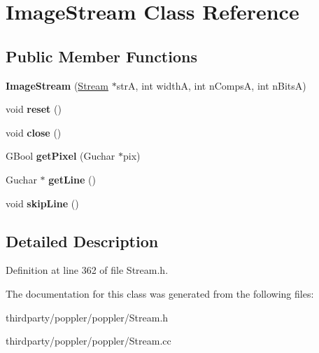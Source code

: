 \hypertarget{class_image_stream}{}\section{Image\+Stream Class Reference}
\label{class_image_stream}
\subsection*{Public Member Functions}
\begin{DoxyCompactItemize}
\item 
\mbox{\label{class_image_stream_a0e4cc8cb8ccb9956cd8f08f92755110c}} 
{\bfseries Image\+Stream} (\hyperlink{class_stream}{Stream} $\ast$strA, int widthA, int n\+CompsA, int n\+BitsA)
\item 
\mbox{\label{class_image_stream_a97cce560b257f33402e6276fec25e076}} 
void {\bfseries reset} ()
\item 
\mbox{\label{class_image_stream_a6211827fb1c99a5928c3d8376899ea96}} 
void {\bfseries close} ()
\item 
\mbox{\label{class_image_stream_a89d4082b1a680f8dd32314a936c3707f}} 
G\+Bool {\bfseries get\+Pixel} (Guchar $\ast$pix)
\item 
\mbox{\label{class_image_stream_ac8550bc1b9caae0cd973f5ee6530b595}} 
Guchar $\ast$ {\bfseries get\+Line} ()
\item 
\mbox{\label{class_image_stream_aaff8627d0a244fd029f37ac08c32cedd}} 
void {\bfseries skip\+Line} ()
\end{DoxyCompactItemize}


\subsection{Detailed Description}


Definition at line 362 of file Stream.\+h.



The documentation for this class was generated from the following files\+:\begin{DoxyCompactItemize}
\item 
thirdparty/poppler/poppler/Stream.\+h\item 
thirdparty/poppler/poppler/Stream.\+cc\end{DoxyCompactItemize}
